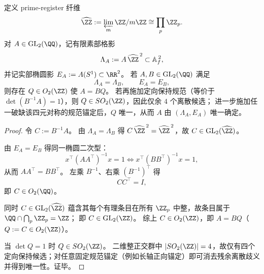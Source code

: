 \begin{theorem}[有限素部格与实部椭圆影的二影刚性]\label{thm:xi-terminal-finite-archimedean-two-shadow-rigidity}
定义 prime-register 纤维
\[
\widehat{\ZZ}:=\varprojlim_m \ZZ/m\ZZ\cong\prod_p \ZZ_p.
\]
对 \(A\in\mathrm{GL}_2(\QQ)\)，记有限素部格影
\[
\Lambda_A:=A\,\widehat{\ZZ}^{\,2}\subset \mathbb A_f^{\,2},
\]
并记实部椭圆影 \(E_A:=A(S^1)\subset\RR^2\)。
若 \(A,B\in\mathrm{GL}_2(\QQ)\) 满足
\[
\Lambda_A=\Lambda_B,
\qquad
E_A=E_B,
\]
则存在 \(Q\in O_2(\ZZ)\) 使 \(A=BQ\)。
若再施加定向保持规范（等价于 \(\det(B^{-1}A)=1\)），则 \(Q\in SO_2(\ZZ)\)，因此仅余 \(4\) 个离散候选；
进一步施加任一破缺该四元对称的规范锚定后，\(Q\) 唯一，从而 \(A\) 由 \((\Lambda_A,E_A)\) 唯一确定。
\end{theorem}
\begin{proof}
令 \(C:=B^{-1}A\)。
由 \(\Lambda_A=\Lambda_B\) 得
\(
C\,\widehat{\ZZ}^{\,2}=\widehat{\ZZ}^{\,2}
\)，故 \(C\in\mathrm{GL}_2(\widehat{\ZZ})\)。

由 \(E_A=E_B\) 得同一椭圆二次型：
\[
x^\top(AA^\top)^{-1}x=1
\Longleftrightarrow
x^\top(BB^\top)^{-1}x=1,
\]
从而 \(AA^\top=BB^\top\)。
左乘 \(B^{-1}\)、右乘 \((B^{-1})^\top\) 得
\[
CC^\top=I,
\]
即 \(C\in O_2(\QQ)\)。

同时 \(C\in\mathrm{GL}_2(\widehat{\ZZ})\) 蕴含其每个有理条目在所有 \(\ZZ_p\) 中整，故条目属于
\(
\QQ\cap\bigcap_p\ZZ_p=\ZZ
\)；
即 \(C\in\mathrm{GL}_2(\ZZ)\)。
综上 \(C\in O_2(\ZZ)\)，即 \(A=BQ\)（\(Q:=C\in O_2(\ZZ)\)）。

当 \(\det Q=1\) 时 \(Q\in SO_2(\ZZ)\)。
二维整正交群中 \(|SO_2(\ZZ)|=4\)，故仅有四个定向保持候选；对任意固定规范锚定（例如长轴正向锚定）即可消去残余离散歧义并得到唯一性。证毕。
\end{proof}
